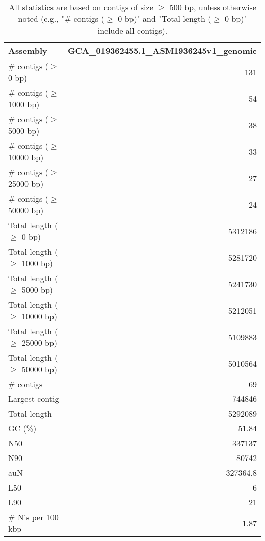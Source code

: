 \documentclass[12pt,a4paper]{article}
\begin{document}
\begin{table}[ht]
\begin{center}
\caption{All statistics are based on contigs of size $\geq$ 500 bp, unless otherwise noted (e.g., "\# contigs ($\geq$ 0 bp)" and "Total length ($\geq$ 0 bp)" include all contigs).}
\begin{tabular}{|l*{1}{|r}|}
\hline
Assembly & GCA\_019362455.1\_ASM1936245v1\_genomic \\ \hline
\# contigs ($\geq$ 0 bp) & 131 \\ \hline
\# contigs ($\geq$ 1000 bp) & 54 \\ \hline
\# contigs ($\geq$ 5000 bp) & 38 \\ \hline
\# contigs ($\geq$ 10000 bp) & 33 \\ \hline
\# contigs ($\geq$ 25000 bp) & 27 \\ \hline
\# contigs ($\geq$ 50000 bp) & 24 \\ \hline
Total length ($\geq$ 0 bp) & 5312186 \\ \hline
Total length ($\geq$ 1000 bp) & 5281720 \\ \hline
Total length ($\geq$ 5000 bp) & 5241730 \\ \hline
Total length ($\geq$ 10000 bp) & 5212051 \\ \hline
Total length ($\geq$ 25000 bp) & 5109883 \\ \hline
Total length ($\geq$ 50000 bp) & 5010564 \\ \hline
\# contigs & 69 \\ \hline
Largest contig & 744846 \\ \hline
Total length & 5292089 \\ \hline
GC (\%) & 51.84 \\ \hline
N50 & 337137 \\ \hline
N90 & 80742 \\ \hline
auN & 327364.8 \\ \hline
L50 & 6 \\ \hline
L90 & 21 \\ \hline
\# N's per 100 kbp & 1.87 \\ \hline
\end{tabular}
\end{center}
\end{table}
\end{document}
